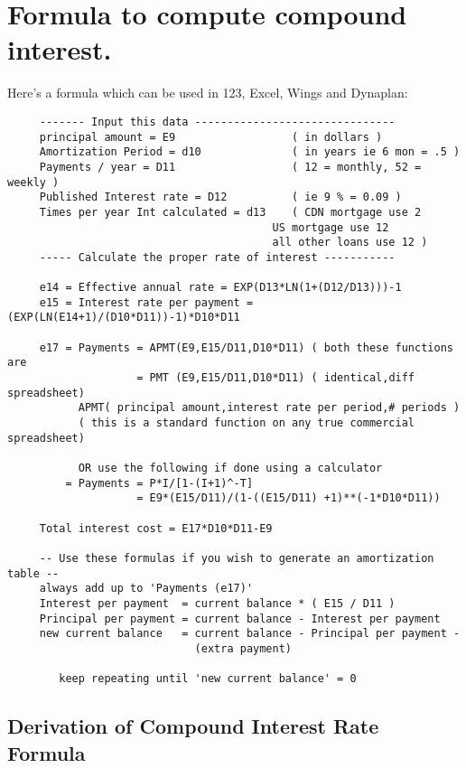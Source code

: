 \section{Formula to compute compound interest.}
Here's a formula which can be used in 123, Excel, Wings and Dynaplan:

\begin{verbatim}
     ------- Input this data -------------------------------
     principal amount = E9                  ( in dollars )
     Amortization Period = d10              ( in years ie 6 mon = .5 )
     Payments / year = D11                  ( 12 = monthly, 52 = weekly )
     Published Interest rate = D12          ( ie 9 % = 0.09 )
     Times per year Int calculated = d13    ( CDN mortgage use 2
                                         US mortgage use 12
                                         all other loans use 12 )
     ----- Calculate the proper rate of interest -----------

     e14 = Effective annual rate = EXP(D13*LN(1+(D12/D13)))-1
     e15 = Interest rate per payment = (EXP(LN(E14+1)/(D10*D11))-1)*D10*D11

     e17 = Payments = APMT(E9,E15/D11,D10*D11) ( both these functions are
                    = PMT (E9,E15/D11,D10*D11) ( identical,diff spreadsheet)
           APMT( principal amount,interest rate per period,# periods )
           ( this is a standard function on any true commercial spreadsheet)

           OR use the following if done using a calculator
         = Payments = P*I/[1-(I+1)^-T]
                    = E9*(E15/D11)/(1-((E15/D11) +1)**(-1*D10*D11))

     Total interest cost = E17*D10*D11-E9

     -- Use these formulas if you wish to generate an amortization table --
     always add up to 'Payments (e17)'
     Interest per payment  = current balance * ( E15 / D11 )
     Principal per payment = current balance - Interest per payment
     new current balance   = current balance - Principal per payment -
                             (extra payment)

        keep repeating until 'new current balance' = 0
\end{verbatim}

\subsection{Derivation of Compound Interest Rate Formula}

